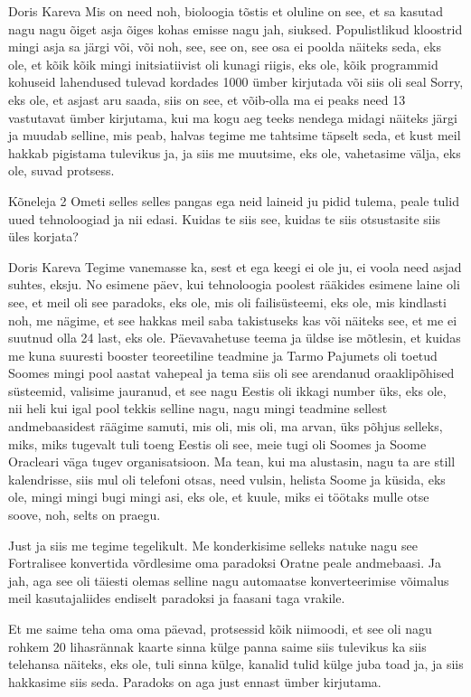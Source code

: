 Doris Kareva
Mis on need noh, bioloogia tõstis et oluline on see, et sa kasutad nagu nagu õiget asja õiges kohas emisse nagu jah, siuksed. Populistlikud kloostrid mingi asja sa järgi või, või noh, see, see on, see osa ei poolda näiteks seda, eks ole, et kõik kõik mingi initsiatiivist oli kunagi riigis, eks ole, kõik programmid kohuseid lahendused tulevad kordades 1000 ümber kirjutada või siis oli seal Sorry, eks ole, et asjast aru saada, siis on see, et võib-olla ma ei peaks need 13 vastutavat ümber kirjutama, kui ma kogu aeg teeks nendega midagi näiteks järgi ja muudab selline, mis peab, halvas tegime me tahtsime täpselt seda, et kust meil hakkab pigistama tulevikus ja, ja siis me muutsime, eks ole, vahetasime välja, eks ole, suvad protsess. 

Kõneleja 2
Ometi selles selles pangas ega neid laineid ju pidid tulema, peale tulid uued tehnoloogiad ja nii edasi. Kuidas te siis see, kuidas te siis otsustasite siis üles korjata? 

Doris Kareva
Tegime vanemasse ka, sest et ega keegi ei ole ju, ei voola need asjad suhtes, eksju. No esimene päev, kui tehnoloogia poolest rääkides esimene laine oli see, et meil oli see paradoks, eks ole, mis oli failisüsteemi, eks ole, mis kindlasti noh, me nägime, et see hakkas meil saba takistuseks kas või näiteks see, et me ei suutnud olla 24 last, eks ole. Päevavahetuse teema ja üldse ise mõtlesin, et kuidas me kuna suuresti booster teoreetiline teadmine ja Tarmo Pajumets oli toetud Soomes mingi pool aastat vahepeal ja tema siis oli see arendanud oraaklipõhised süsteemid, valisime jauranud, et see nagu Eestis oli ikkagi number üks, eks ole, nii heli kui igal pool tekkis selline nagu, nagu mingi teadmine sellest andmebaasidest räägime samuti, mis oli, mis oli, ma arvan, üks põhjus selleks, miks, miks tugevalt tuli toeng Eestis oli see, meie tugi oli Soomes ja Soome Oracleari väga tugev organisatsioon. Ma tean, kui ma alustasin, nagu ta are still kalendrisse, siis mul oli telefoni otsas, need vulsin, helista Soome ja küsida, eks ole, mingi mingi bugi mingi asi, eks ole, et kuule, miks ei töötaks mulle otse soove, noh, selts on praegu. 

Just ja siis me tegime tegelikult. Me konderkisime selleks natuke nagu see Fortralisee konvertida võrdlesime oma paradoksi Oratne peale andmebaasi. Ja jah, aga see oli täiesti olemas selline nagu automaatse konverteerimise võimalus meil kasutajaliides endiselt paradoksi ja faasani taga vrakile. 

Et me saime teha oma oma päevad, protsessid kõik niimoodi, et see oli nagu rohkem 20 lihasrännak kaarte sinna külge panna saime siis tulevikus ka siis telehansa näiteks, eks ole, tuli sinna külge, kanalid tulid külge juba toad ja, ja siis hakkasime siis seda. Paradoks on aga just ennast ümber kirjutama. 

